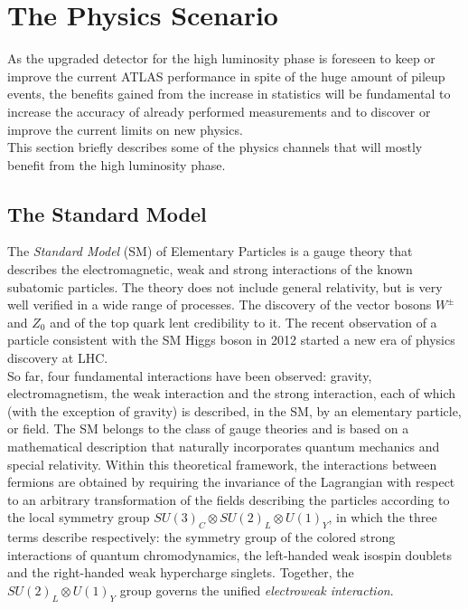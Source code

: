 \documentclass[a4paper,twoside,12pt]{book}
\begin{document}
\clearpage

\chapter{The Physics Scenario}\label{sec:physics}

As the upgraded detector for the high luminosity phase is foreseen to keep or improve
the current ATLAS performance in spite of the huge amount of pileup events, the benefits gained from the increase in statistics
will be fundamental to increase the accuracy of already performed measurements and
to discover or improve the current limits on new physics.\\

This section briefly describes some of the physics channels that will mostly benefit
from the high luminosity phase.

\section{The Standard Model}
The \textit{Standard Model} (SM) of Elementary Particles is a gauge theory that describes
the electromagnetic, weak and strong interactions of the known subatomic particles. 
The theory does not include general relativity, but is very well verified in a wide range of
processes. The discovery of the vector bosons $W^{\pm}$ and $Z_{0}$\cite{ZDiscovery} and 
of the top quark\cite{CDFTopDiscovery}\cite{D0TopDiscovery} lent credibility to it. The recent observation of a
particle consistent with the SM Higgs boson\cite{ATLASHiggsDiscovery}\cite{CMSHiggsDiscovery} in 2012 started a new era
of physics discovery at LHC.\\ %

So far, four fundamental interactions have been observed: gravity, electromagnetism, 
the weak interaction and the strong interaction, each of which (with the exception of gravity)
is described, in the SM, by an elementary particle, or field. The SM belongs to the
class of gauge theories and is based on a mathematical description that naturally
incorporates quantum mechanics and special relativity. Within this theoretical framework, the interactions between 
fermions are obtained by requiring the invariance of the
Lagrangian with respect to an arbitrary transformation of the fields describing the particles
according to the local symmetry group \mbox{$SU (3)_{C} \otimes SU (2)_{L} \otimes U(1)_{Y}$}, in which the
three terms describe respectively: the symmetry group of the colored strong interactions
of quantum chromodynamics, the left-handed weak isospin doublets and the right-handed
weak hypercharge singlets. Together, the $SU (2)_{L} \otimes U(1)_{Y}$ group governs the
unified \textit{electroweak interaction}. \\
\end{document}
